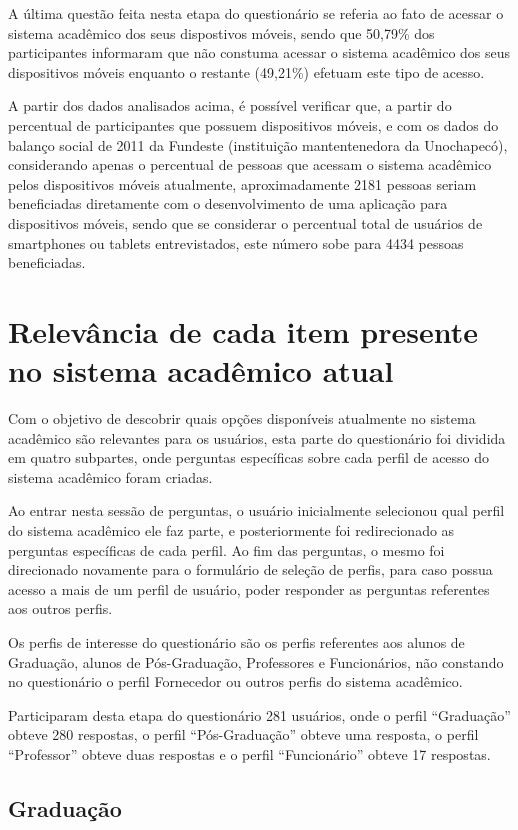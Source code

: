 A última questão feita nesta etapa do questionário se referia ao fato de acessar o sistema acadêmico dos seus dispostivos móveis, sendo que 50,79\% dos participantes informaram que não constuma acessar o sistema acadêmico dos seus dispositivos móveis enquanto o restante (49,21\%) efetuam este tipo de acesso. 

A partir dos dados analisados acima, é possível verificar que, a partir do percentual de participantes que possuem dispositivos móveis, e com os dados do balanço social de 2011 da Fundeste (instituição mantentenedora da Unochapecó), considerando apenas o percentual de pessoas que acessam o sistema acadêmico pelos dispositivos móveis atualmente, aproximadamente 2181 pessoas seriam beneficiadas diretamente com o desenvolvimento de uma aplicação para dispositivos móveis, sendo que se considerar o percentual total de usuários de smartphones ou tablets entrevistados, este número sobe para 4434 pessoas beneficiadas.

\section{Relevância de cada item presente no sistema acadêmico atual}
Com o objetivo de descobrir quais opções disponíveis atualmente no sistema acadêmico são relevantes para os usuários, esta parte do questionário foi dividida em quatro subpartes, onde perguntas específicas sobre cada perfil de acesso do sistema acadêmico foram criadas. 

Ao entrar nesta sessão de perguntas, o usuário inicialmente selecionou qual perfil do sistema acadêmico ele faz parte, e posteriormente foi redirecionado as perguntas específicas de cada perfil. Ao fim das perguntas, o mesmo foi direcionado novamente para o formulário de seleção de perfis, para caso possua acesso a mais de um perfil de usuário, poder responder as perguntas referentes aos outros perfis.

Os perfis de interesse do questionário são os perfis referentes aos alunos de Graduação, alunos de Pós-Graduação, Professores e Funcionários, não constando no questionário o perfil Fornecedor ou outros perfis do sistema acadêmico.

Participaram desta etapa do questionário 281 usuários, onde o perfil “Graduação'' obteve 280 respostas, o perfil “Pós-Graduação'' obteve uma resposta, o perfil “Professor'' obteve duas respostas e o perfil “Funcionário'' obteve 17 respostas.

\subsection{Graduação}

